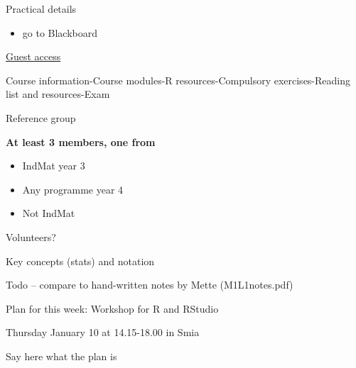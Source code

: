 \documentclass[ignorenonframetext,]{beamer}
\providecommand{\tightlist}{%
  \setlength{\itemsep}{0pt}\setlength{\parskip}{0pt}}
\begin{document}
\begin{frame}{Practical details}

\begin{itemize}
\tightlist
\item
  go to Blackboard
\end{itemize}

\href{https://ntnu.blackboard.com/webapps/blackboard/execute/modulepage/view?course_id=_7960_1\&cmp_tab_id=_40192_1\&mode=view}{Guest
access}

Course information-Course modules-R resources-Compulsory
exercises-Reading list and resources-Exam

\end{frame}

\begin{frame}{Reference group}

\textbf{At least 3 members, one from}

\begin{itemize}
\tightlist
\item
  IndMat year 3
\item
  Any programme year 4
\item
  Not IndMat
\end{itemize}

Volunteers?

\end{frame}

\begin{frame}{Key concepts (stats) and notation}

\begin{block}{Todo -- compare to hand-written notes by Mette
(M1L1notes.pdf)}

\end{block}

\end{frame}

\begin{frame}{Plan for this week: Workshop for R and RStudio}

\begin{block}{Thursday January 10 at 14.15-18.00 in Smia}

Say here what the plan is

\end{block}

\end{frame}
\end{document}
